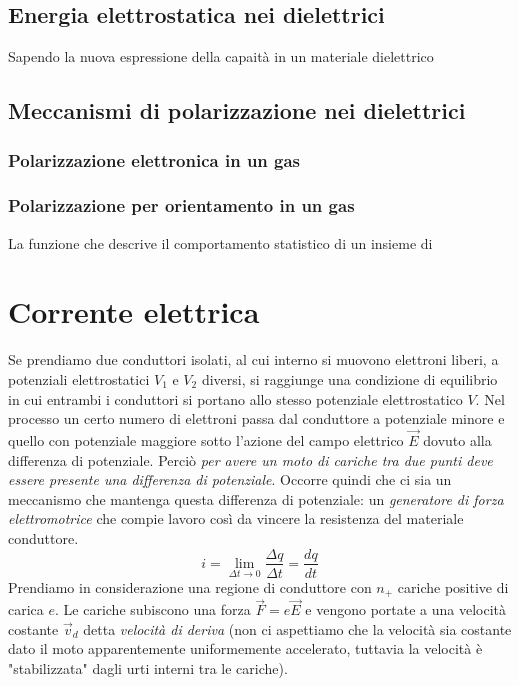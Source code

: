 \documentclass[x11names]{report}
\begin{document}
\subsection{Energia elettrostatica nei dielettrici}
Sapendo la nuova espressione della capaità in un materiale dielettrico

\subsection{Meccanismi di polarizzazione nei dielettrici}
\subsubsection{Polarizzazione elettronica in un gas}
\subsubsection{Polarizzazione per orientamento in un gas}
La funzione che descrive il comportamento statistico di un insieme di 

\newpage


\section{Corrente elettrica}
Se prendiamo due conduttori isolati, al cui interno si muovono elettroni liberi, a potenziali elettrostatici \(V_1\) e \(V_2\) diversi, si raggiunge una condizione di equilibrio in cui entrambi i conduttori si portano allo stesso potenziale elettrostatico \(V\). Nel processo un certo numero di elettroni passa dal conduttore a potenziale minore e quello con potenziale maggiore sotto l'azione del campo elettrico \(\vec{E}\) dovuto alla differenza di potenziale. Perciò \textit{per avere un moto di cariche tra due punti deve essere presente una differenza di potenziale}. Occorre quindi che ci sia un meccanismo che mantenga questa differenza di potenziale: un \textit{generatore di forza elettromotrice} che compie lavoro così da vincere la resistenza del materiale conduttore. 
\[
i =  \lim_{\Delta t \to 0} \frac{\Delta q}{\Delta t} = \frac{dq}{dt}
\]
Prendiamo in considerazione una regione di conduttore con \(n_+\) cariche positive di carica \(e\). Le cariche subiscono una forza \(\vec{F} = e\vec{E}\) e vengono portate a una velocità costante \(\vec{v}_d\) detta \textit{velocità di deriva} (non ci aspettiamo che la velocità sia costante dato il moto apparentemente uniformemente accelerato, tuttavia la velocità è "stabilizzata" dagli urti interni tra le cariche).
\end{document}
